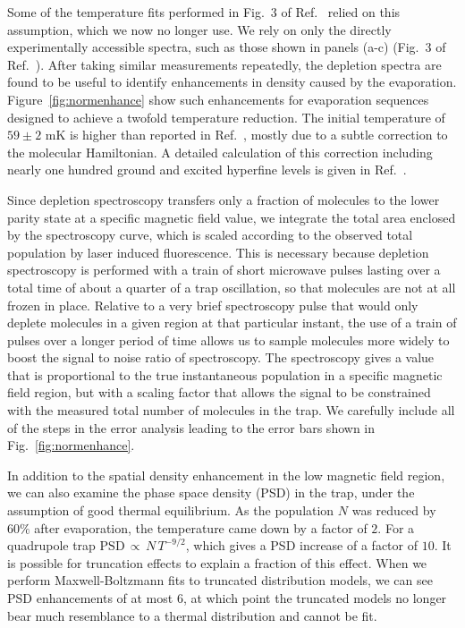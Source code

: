 \documentclass[%
 reprint,
 amsmath,amssymb,
 aps,
prl,
]{revtex4-1}
\begin{document}
Some of the temperature fits performed in Fig.~3 of Ref.~\cite{Stuhl2012evap} relied on this assumption, which we now no longer use. We rely on only the directly experimentally accessible spectra, such as those shown in panels (a-c) (Fig.~3 of Ref.~\cite{Stuhl2012evap}). After taking similar measurements repeatedly, the depletion spectra are found to be useful to identify enhancements in density caused by the evaporation. Figure~\ref{fig:normenhance} show such enhancements for evaporation sequences designed to achieve a twofold temperature reduction. The initial temperature of $59\pm2\text{ mK}$ is higher than reported in Ref.~\cite{Stuhl2012evap}, mostly due to a subtle correction to the molecular Hamiltonian.  A detailed calculation of this correction including nearly one hundred ground and excited hyperfine levels is given in Ref.~\cite{Maeda2015}.

Since depletion spectroscopy transfers only a fraction of molecules to the lower parity state at a specific magnetic field value, we integrate the total area enclosed by the spectroscopy curve, which is scaled according to the observed total population by laser induced fluorescence.  
This is necessary because depletion spectroscopy is performed with a train of short microwave pulses lasting over a total time of about a quarter of a trap oscillation, so that molecules are not at all frozen in place. 
Relative to a very brief spectroscopy pulse that would only deplete molecules in a given region at that particular instant, the use of a train of pulses over a longer period of time allows us to sample molecules more widely to boost the signal to noise ratio of spectroscopy. 
The spectroscopy gives a value that is proportional to the true instantaneous population in a specific magnetic field region, but with a scaling factor that allows the signal to be constrained with the measured total number of molecules in the trap. 
We carefully include all of the steps in the error analysis leading to the error bars shown in Fig.~\ref{fig:normenhance}.

In addition to the spatial density enhancement in the low magnetic field region, we can also examine the phase space density (PSD) in the trap, under the assumption of good thermal equilibrium. 
As the population $N$ was reduced by $60\%$ after evaporation, the temperature came down by a factor of $2$. 
For a quadrupole trap $\text{PSD}\,{\propto}\,N\,T^{-9/2}$, which gives a PSD increase of a factor of $10$. 
It is possible for truncation effects to explain a fraction of this effect.
When we perform Maxwell-Boltzmann fits to truncated distribution models, we can see PSD enhancements of at most $6$, at which point the truncated models no longer bear much resemblance to a thermal distribution and cannot be fit.
\end{document}
